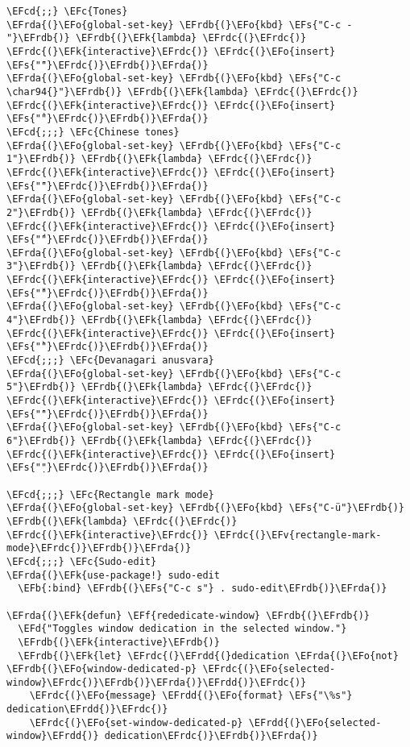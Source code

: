 \documentclass[a4wide,10pt]{article}
\newcommand{\EFc}[1]{\textcolor{EFc}{#1}} %
\newcommand{\EFcd}[1]{\textcolor{EFcd}{#1}} %
\newcommand{\EFs}[1]{\textcolor{EFs}{#1}} %
\newcommand{\EFd}[1]{\textcolor{EFd}{#1}} %
\newcommand{\EFk}[1]{\textcolor{EFk}{#1}} %
\newcommand{\EFb}[1]{\textcolor{EFb}{#1}} %
\newcommand{\EFf}[1]{\textcolor{EFf}{#1}} %
\newcommand{\EFv}[1]{\textcolor{EFv}{#1}} %
\newcommand{\EFo}[1]{\textcolor{EFo}{#1}} %
\newcommand{\EFrda}[1]{\textcolor{EFrda}{#1}} %
\newcommand{\EFrdb}[1]{\textcolor{EFrdb}{#1}} %
\newcommand{\EFrdc}[1]{\textcolor{EFrdc}{#1}} %
\newcommand{\EFrdd}[1]{\textcolor{EFrdd}{#1}} %
\begin{document}
\begin{Code}
\begin{Verbatim}
\EFcd{;;} \EFc{Tones}
\EFrda{(}\EFo{global-set-key} \EFrdb{(}\EFo{kbd} \EFs{"C-c -"}\EFrdb{)} \EFrdb{(}\EFk{lambda} \EFrdc{(}\EFrdc{)} \EFrdc{(}\EFk{interactive}\EFrdc{)} \EFrdc{(}\EFo{insert} \EFs{"̄"}\EFrdc{)}\EFrdb{)}\EFrda{)}
\EFrda{(}\EFo{global-set-key} \EFrdb{(}\EFo{kbd} \EFs{"C-c \char94{}"}\EFrdb{)} \EFrdb{(}\EFk{lambda} \EFrdc{(}\EFrdc{)} \EFrdc{(}\EFk{interactive}\EFrdc{)} \EFrdc{(}\EFo{insert} \EFs{"̂"}\EFrdc{)}\EFrdb{)}\EFrda{)}
\EFcd{;;;} \EFc{Chinese tones}
\EFrda{(}\EFo{global-set-key} \EFrdb{(}\EFo{kbd} \EFs{"C-c 1"}\EFrdb{)} \EFrdb{(}\EFk{lambda} \EFrdc{(}\EFrdc{)} \EFrdc{(}\EFk{interactive}\EFrdc{)} \EFrdc{(}\EFo{insert} \EFs{"̄"}\EFrdc{)}\EFrdb{)}\EFrda{)}
\EFrda{(}\EFo{global-set-key} \EFrdb{(}\EFo{kbd} \EFs{"C-c 2"}\EFrdb{)} \EFrdb{(}\EFk{lambda} \EFrdc{(}\EFrdc{)} \EFrdc{(}\EFk{interactive}\EFrdc{)} \EFrdc{(}\EFo{insert} \EFs{"́"}\EFrdc{)}\EFrdb{)}\EFrda{)}
\EFrda{(}\EFo{global-set-key} \EFrdb{(}\EFo{kbd} \EFs{"C-c 3"}\EFrdb{)} \EFrdb{(}\EFk{lambda} \EFrdc{(}\EFrdc{)} \EFrdc{(}\EFk{interactive}\EFrdc{)} \EFrdc{(}\EFo{insert} \EFs{"̌"}\EFrdc{)}\EFrdb{)}\EFrda{)}
\EFrda{(}\EFo{global-set-key} \EFrdb{(}\EFo{kbd} \EFs{"C-c 4"}\EFrdb{)} \EFrdb{(}\EFk{lambda} \EFrdc{(}\EFrdc{)} \EFrdc{(}\EFk{interactive}\EFrdc{)} \EFrdc{(}\EFo{insert} \EFs{"̀"}\EFrdc{)}\EFrdb{)}\EFrda{)}
\EFcd{;;;} \EFc{Devanagari anusvara}
\EFrda{(}\EFo{global-set-key} \EFrdb{(}\EFo{kbd} \EFs{"C-c 5"}\EFrdb{)} \EFrdb{(}\EFk{lambda} \EFrdc{(}\EFrdc{)} \EFrdc{(}\EFk{interactive}\EFrdc{)} \EFrdc{(}\EFo{insert} \EFs{"̇"}\EFrdc{)}\EFrdb{)}\EFrda{)}
\EFrda{(}\EFo{global-set-key} \EFrdb{(}\EFo{kbd} \EFs{"C-c 6"}\EFrdb{)} \EFrdb{(}\EFk{lambda} \EFrdc{(}\EFrdc{)} \EFrdc{(}\EFk{interactive}\EFrdc{)} \EFrdc{(}\EFo{insert} \EFs{"̣"}\EFrdc{)}\EFrdb{)}\EFrda{)}

\EFcd{;;;} \EFc{Rectangle mark mode}
\EFrda{(}\EFo{global-set-key} \EFrdb{(}\EFo{kbd} \EFs{"C-ü"}\EFrdb{)} \EFrdb{(}\EFk{lambda} \EFrdc{(}\EFrdc{)} \EFrdc{(}\EFk{interactive}\EFrdc{)} \EFrdc{(}\EFv{rectangle-mark-mode}\EFrdc{)}\EFrdb{)}\EFrda{)}
\EFcd{;;;} \EFc{Sudo-edit}
\EFrda{(}\EFk{use-package!} sudo-edit
  \EFb{:bind} \EFrdb{(}\EFs{"C-c s"} . sudo-edit\EFrdb{)}\EFrda{)}

\EFrda{(}\EFk{defun} \EFf{rededicate-window} \EFrdb{(}\EFrdb{)}
  \EFd{"Toggles window dedication in the selected window."}
  \EFrdb{(}\EFk{interactive}\EFrdb{)}
  \EFrdb{(}\EFk{let} \EFrdc{(}\EFrdd{(}dedication \EFrda{(}\EFo{not} \EFrdb{(}\EFo{window-dedicated-p} \EFrdc{(}\EFo{selected-window}\EFrdc{)}\EFrdb{)}\EFrda{)}\EFrdd{)}\EFrdc{)}
    \EFrdc{(}\EFo{message} \EFrdd{(}\EFo{format} \EFs{"\%s"} dedication\EFrdd{)}\EFrdc{)}
    \EFrdc{(}\EFo{set-window-dedicated-p} \EFrdd{(}\EFo{selected-window}\EFrdd{)} dedication\EFrdc{)}\EFrdb{)}\EFrda{)}


\end{Verbatim}
\end{Code}
\end{document}
